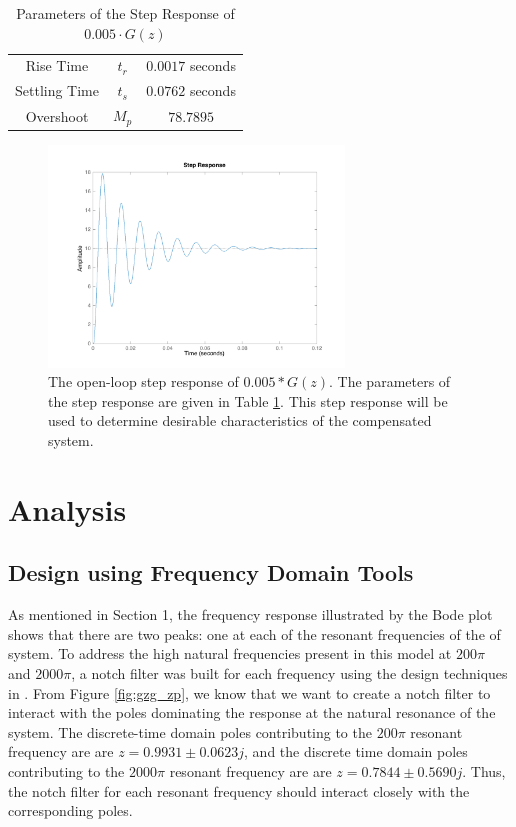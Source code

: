 \documentclass[11pt]{article}
\begin{document}
\begin{table}[H]
    \centering
    \begin{tabular}{c|c|c} 
        \hline
        Rise Time & $t_{r}$ & $0.0017$ seconds\\
        Settling Time & $t_{s}$ & $0.0762$ seconds\\
        Overshoot & $M_{p}$ & $78.7895$\\
        \hline
    \end{tabular}
    \caption{Parameters of the Step Response of $0.005 \cdot G(z)$}
    \label{tab:gzSR}
\end{table}

\begin{figure}[H]
    \centering
    \includegraphics[width=0.7\textwidth]{ECEN5458_gzSR.png}
    \caption{The open-loop step response of $0.005*G(z)$. The parameters of the step response are given in Table \ref{tab:gzSR}. This step response will be used to determine desirable characteristics of the compensated system.}
    \label{fig:GzSR}
\end{figure}




\section{Analysis}
\subsection{Design using Frequency Domain Tools}
As mentioned in Section 1, the frequency response illustrated by the Bode plot shows that there are two peaks: one at each of the resonant frequencies of the of system. To address the high natural frequencies present in this model at $200\pi$ and $2000\pi$, a notch filter was built for each frequency using the design techniques in \cite{notchF}. From Figure \ref{fig:gzg_zp}, we know that we want to create a notch filter to interact with the poles dominating the response at the natural resonance of the system. The discrete-time domain poles contributing to the $200\pi$ resonant frequency are are $z = 0.9931 \pm 0.0623j$, and the discrete time domain poles contributing to the $2000\pi$ resonant frequency are are $z = 0.7844 \pm 0.5690j$. Thus, the notch filter for each resonant frequency should interact closely with the corresponding poles. \\
\end{document}
